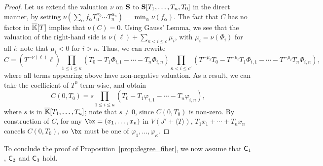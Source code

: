 \documentclass[12pt]{article}
\begin{document}
\begin{proof}
  Let us extend the valuation $\nu$ on $\mathbf{S}$ to
  $\mathbf{S}[T_1,\dots,T_n,T_0]$ in the direct manner, by setting
  $\nu(\sum_\alpha f_\alpha T_0^{\alpha_0} \cdots T_n^{\alpha_n}) =
  \min_\alpha \nu(f_\alpha)$. The fact that $C$ has no factor in
  $\overline{\mathbb{K}}[T]$ implies that $\nu(C)=0$. Using Gauss' Lemma, we see that
  the valuation of the right-hand side is $\nu(\ell) + \sum_{\kappa <
    i \le c}\mu_i$, with $\mu_i= \nu(\Phi_i)$ for all $i$; note that
  $\mu_i < 0$ for $i > \kappa$. Thus, we can rewrite
  $$C =\left ({T}^{-\nu(\ell)} \ell\right ) 
  \prod_{1 \le i \le \kappa}(T_0-T_1 \Phi_{i,1} - \cdots - T_n  \Phi_{i,n} )
  \prod_{\kappa < i \le c'} ({T}^{-\mu_i}T_0-{T}^{-\mu_i}T_1 \Phi_{i,1} - \cdots - {T}^{-\mu_i}T_n  \Phi_{i,n} ),$$
  where all terms appearing above have non-negative valuation.
  As a result, we can take the coefficient of ${T}^0$ term-wise,
  and obtain
  $$C(0,T_0) = s \prod_{1 \le i \le \kappa}(T_0-T_1 \varphi_{i,1} -
  \cdots - T_n \varphi_{i,n} ),$$ where $s$ is in $\overline{\mathbb{K}}[T_1,\dots,T_n]$;
  note that $s \ne 0$, since $C(0,T_0)$ is non-zero.
 By construction of $C$, for any
  $\bx=(x_1,\dots,x_n)$ in $V(J'+\langle T \rangle)$, $T_1 x_1 + \cdots + T_n x_n$
  cancels $C(0,T_0)$, so $\bx$ must be one of
  $\varphi_1,\dots,\varphi_{\kappa}$.
\end{proof}

To conclude the proof of Proposition~\ref{prop:degree_fiber}, we now
assume that $\mathsf{C}_1$, $\mathsf{C}_2$ and $\mathsf{C}_3$ hold.
\end{document}
